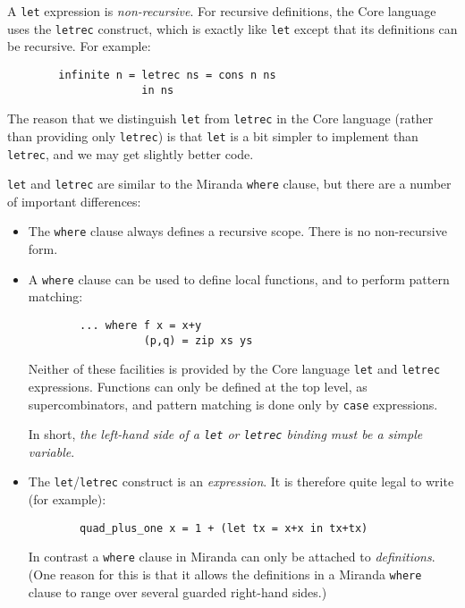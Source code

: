 A \mbox{\tt let} expression is {\em non-recursive}.
For recursive definitions, the Core language
uses the \mbox{\tt letrec} construct, which is exactly like \mbox{\tt let} except that
its definitions can be recursive.  For example:
\begin{verbatim}
        infinite n = letrec ns = cons n ns
                     in ns
\end{verbatim}
The reason that we distinguish \mbox{\tt let} from \mbox{\tt letrec} in the Core language (rather
than providing only \mbox{\tt letrec}) is that \mbox{\tt let} is a bit simpler
to implement than \mbox{\tt letrec}, and we may get slightly better code.

\mbox{\tt let} and \mbox{\tt letrec} are similar to the Miranda \mbox{\tt where} clause, but there
are a number of important differences:
\begin{itemize}
\item
The \mbox{\tt where} clause always defines a recursive scope.  There is no non-recursive
form.

\item
A \mbox{\tt where} clause can be used to define local functions, and
to perform pattern matching:
\begin{verbatim}
        ... where f x = x+y
                  (p,q) = zip xs ys
\end{verbatim}
Neither of these facilities is provided by the Core language \mbox{\tt let} and
\mbox{\tt letrec} expressions.
Functions can only be defined at the top level, as supercombinators, and
pattern matching is done only by \mbox{\tt case} expressions.

In short, {\em the left-hand side of a \mbox{\tt let} or \mbox{\tt letrec}
binding must be a simple variable}.

\item
The \mbox{\tt let}/\mbox{\tt letrec} construct is an {\em expression}.
It is therefore quite legal to write (for example):
\begin{verbatim}
        quad_plus_one x = 1 + (let tx = x+x in tx+tx)
\end{verbatim}
In contrast a \mbox{\tt where} clause in Miranda can only be attached to
{\em definitions}.  (One reason for this is that it allows the definitions
in a Miranda \mbox{\tt where} clause
to range over several guarded right-hand sides.)
\end{itemize}

